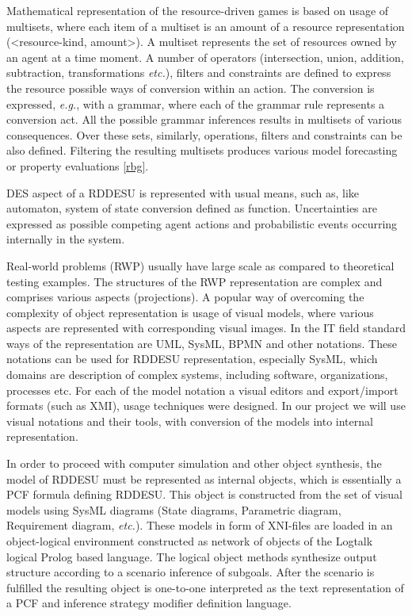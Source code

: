 \documentclass[runningheads]{llncs}
\begin{document}
Mathematical representation of the resource-driven games is based on usage of multisets, where each item of a multiset is an amount of a resource representation (<resource-kind, amount>). A multiset represents the set of resources owned by an agent at a time moment. A number of operators (intersection, union, addition, subtraction, transformations \emph{etc.}), filters and constraints are defined to express the resource possible ways of conversion within an action. The conversion is expressed, \emph{e.g.}, with a grammar, where each of the grammar rule represents a conversion act. All the possible grammar inferences results in multisets of various consequences. Over these sets, similarly, operations, filters and constraints can be also defined. Filtering the resulting multisets produces various model forecasting or property evaluations \ref{rbg}.

DES aspect of a RDDESU is represented with usual means, such as, like automaton, system of state conversion defined as function.  Uncertainties are expressed as possible competing agent actions and probabilistic events occurring internally in the system.

Real-world problems (RWP) usually have large scale as compared to theoretical testing examples. The structures of the RWP representation are complex and comprises various aspects (projections). A popular way of overcoming the complexity of object representation is usage of visual models, where various aspects are represented with corresponding visual images. In the IT field standard ways of the representation are UML, SysML, BPMN and other notations. These notations can be used for RDDESU representation, especially SysML, which domains are description of complex systems, including software, organizations, processes etc. For each of the model notation a visual editors and export/import formats (such as XMI), usage techniques were designed. In our project we will use visual notations and their tools, with conversion of the models into internal representation.

In order to proceed with computer simulation and other object synthesis, the model of RDDESU must be represented as internal objects, which is essentially a PCF formula defining RDDESU. This object is constructed from the set of visual models using SysML diagrams (State diagrams, Parametric diagram, Requirement diagram, \emph{etc.}). These models in form of XNI-files are loaded in an object-logical environment constructed as network of objects of the Logtalk logical Prolog based language. The logical object methods synthesize output structure according to a scenario inference of subgoals. After the scenario is fulfilled the resulting object is one-to-one interpreted as the text representation of a PCF and inference strategy modifier definition language.
\end{document}

